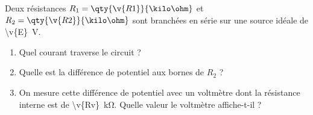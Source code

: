 Deux résistances $R_1 = \qty{\v{R1}}{\kilo\ohm}$ et $R_2 = \qty{\v{R2}}{\kilo\ohm}$ sont branchées en série sur une source idéale de \qty{\v{E}}{V}.

\begin{enumerate}[label=\alph*)]
    \item Quel courant traverse le circuit ?
    \item Quelle est la différence de potentiel aux bornes de $R_2$ ?
    \item On mesure cette différence de potentiel avec un voltmètre dont la résistance interne est de \qty{\v{Rv}}{\kilo\ohm}. Quelle valeur le voltmètre affiche-t-il ?
\end{enumerate}
